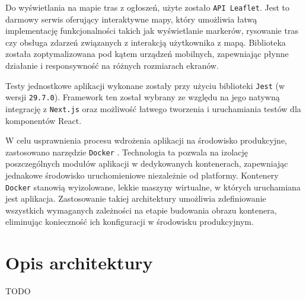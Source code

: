 Do wyświetlania na mapie tras z ogłoszeń, użyte zostało \texttt{API Leaflet}. Jest to darmowy serwis oferujący interaktywne mapy, który umożliwia łatwą implementację funkcjonalności takich jak wyświetlanie markerów, rysowanie tras czy obsługa zdarzeń związanych z interakcją użytkownika z mapą. Biblioteka została zoptymalizowana pod kątem urządzeń mobilnych, zapewniając płynne działanie i responsywność na różnych rozmiarach ekranów.

Testy jednostkowe aplikacji wykonane zostały przy użyciu biblioteki \texttt{Jest} \cite{Jest} (w wersji \texttt{29.7.0}). Framework ten został wybrany ze względu na jego natywną integrację z \texttt{Next.js} oraz możliwość łatwego tworzenia i uruchamiania testów dla komponentów React.

W celu usprawnienia procesu wdrożenia aplikacji na środowisko produkcyjne, zastosowano narzędzie \texttt{Docker} \cite{Docker}. Technologia ta pozwala na izolację poszczególnych modułów aplikacji w dedykowanych kontenerach, zapewniając jednakowe środowisko uruchomieniowe niezależnie od platformy. Kontenery \texttt{Docker} stanowią wyizolowane, lekkie maszyny wirtualne, w których uruchamiana jest aplikacja. Zastosowanie takiej architektury umożliwia zdefiniowanie wszystkich wymaganych zależności na etapie budowania obrazu kontenera, eliminując konieczność ich konfiguracji w środowisku produkcyjnym.

\section{Opis architektury}
TODO
